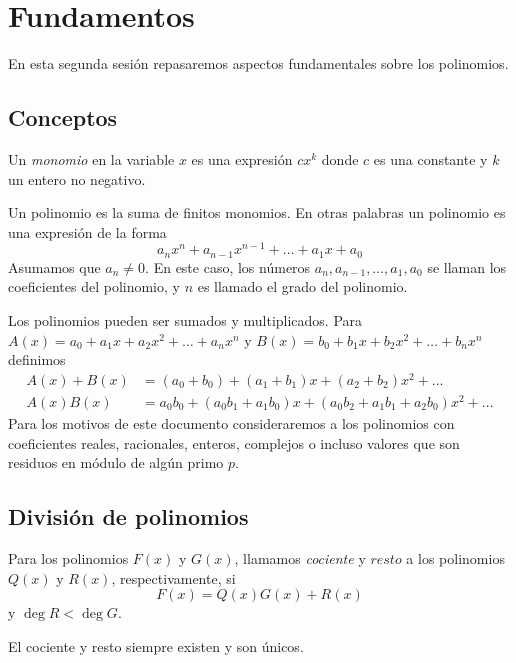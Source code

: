 \section{Fundamentos}

En esta segunda sesión repasaremos aspectos fundamentales sobre los polinomios.

\subsection{Conceptos}

\begin{definition}
    Un \textit{monomio} en la variable $x$ es una expresión $c x^k$ donde $c$ es una constante y $k$ un entero no negativo.
\end{definition}

Un polinomio es la suma de finitos monomios.
En otras palabras un polinomio es una expresión de la forma
\[
    a_n x^n + a_{n - 1} x^{n - 1} + \ldots + a_1 x + a_0
\]
Asumamos que $a_n \neq 0$.
En este caso, los números $a_n, a_{n - 1}, \ldots, a_1, a_0$ se llaman los coeficientes del polinomio, y $n$ es llamado el grado del polinomio.

Los polinomios pueden ser sumados y multiplicados.
Para $A(x) = a_0 + a_1 x + a_2 x^2 + \ldots +a_n x^n$ y $B(x) = b_0 + b_1 x + b_2 x^2 + \ldots + b_n x^n$ definimos
\begin{align*}
    A(x) + B(x) &= (a_0 + b_0) + (a_1 + b_1)x + (a_2 + b_2)x^2 + \ldots\\[2mm]
    A(x)B(x) &= a_0 b_0 + (a_0 b_1 + a_1 b_0)x + (a_0 b_2 + a_1 b_1 + a_2 b_0)x^2 + \ldots
\end{align*}
Para los motivos de este documento consideraremos a los polinomios con coeficientes reales, racionales, enteros, complejos o incluso
valores que son residuos en módulo de algún primo $p$.

\subsection{División de polinomios}

\begin{definition}
    Para los polinomios $F(x)$ y $G(x)$, llamamos \textit{cociente} y $\textit{resto}$ a los polinomios $Q(x)$ y $R(x)$,
    respectivamente, si
    \[
        F(x) = Q(x) G(x) + R(x)
    \]
    y $\deg{R} < \deg{G}$.
\end{definition}

\begin{theorem}
    El cociente y resto siempre existen y son únicos.
\end{theorem}

